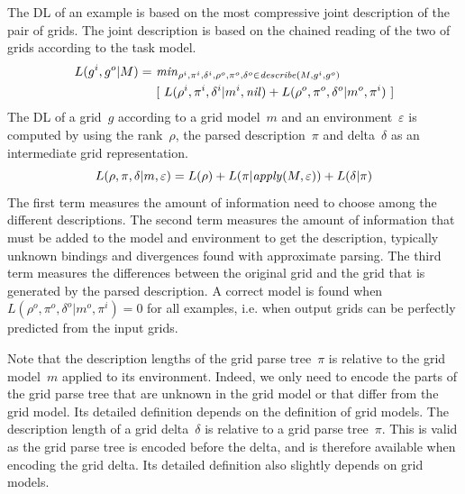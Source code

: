\documentclass[a4paper]{llncs}
\begin{document}
The DL of an example is based on the most compressive joint
description of the pair of grids. The joint description is based on
the chained reading of the two of grids according to the task
model.
%
\begin{align*}
  L(g^i,g^o|M) =\ & {\it min}_{\rho^i, \pi^i, \delta^i, \rho^o, \pi^o, \delta^o \in {\it describe}(M,g^i,g^o)} \\
                 & [\  L(\rho^i,\pi^i,\delta^i|m^i,{\it nil}) + L(\rho^o,\pi^o,\delta^o|m^o,\pi^i) \ ]
\end{align*}
%
The DL of a grid~$g$ according to a grid model~$m$ and an
environment~$\varepsilon$ is computed by using the rank~$\rho$, the
parsed description~$\pi$ and delta~$\delta$ as an intermediate grid
representation.
\[ L(\rho,\pi,\delta|m,\varepsilon) = L(\rho) + L(\pi|{\it apply}(M,\varepsilon)) + L(\delta|\pi) \]
%
The first term measures the amount of information need to choose among
the different descriptions. The second term measures the amount of
information that must be added to the model and environment to get the
description, typically unknown bindings and divergences found with
approximate parsing. The third term measures the differences between
the original grid and the grid that is generated by the parsed
description.
%
A correct model is found when $L(\rho^o,\pi^o,\delta^o|m^o,\pi^i) = 0$
for all examples, i.e. when output grids can be perfectly predicted
from the input grids.

Note that the description lengths of the grid parse
tree~$\pi$ is relative to the grid model~$m$ applied to its
environment. Indeed, we only need to encode the parts of the grid
parse tree that are unknown in the grid model or that differ from the
grid model. Its detailed definition depends on the definition of grid
models.
%
The description length of a grid delta~$\delta$ is relative to a grid
parse tree~$\pi$. This is valid as the grid parse tree is encoded
before the delta, and is therefore available when encoding the grid
delta. Its detailed definition also slightly depends on grid models.
\end{document}
